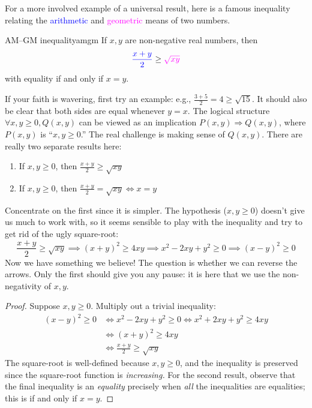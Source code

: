 For a more involved example of a universal result, here is a famous inequality relating the \textcolor{blue}{arithmetic} and \textcolor{Magenta}{geometric} means of two numbers.

\begin{thm}{AM--GM inequality}{amgm}
	If $x,y$ are non-negative real numbers, then
	\[
		\textcolor{blue}{\frac{x+y}{2}}\ge\textcolor{Magenta}{\sqrt{xy}}
	\]
	with equality if and only if $x=y$.
\end{thm}

If your faith is wavering, first try an example: e.g., $\frac{3+5}2=4\ge \sqrt{15}$. It should also be clear that both sides are equal whenever $y=x$. The logical structure $\forall x,y\ge 0, Q(x,y)$ can be viewed as an implication $P(x,y)\Longrightarrow Q(x,y)$, where $P(x,y)$ is ``$x,y\ge 0$.'' The real challenge is making sense of $Q(x,y)$. There are really two separate results here:
\begin{enumerate}
  \item If $x,y\ge 0$, then $\frac{x+y}{2}\ge\sqrt{xy}$
  \item If $x,y\ge 0$, then $\frac{x+y}{2}=\sqrt{xy}\iff x=y$
\end{enumerate}

Concentrate on the first since it is simpler. The hypothesis ($x,y\ge 0$) doesn't give us much to work with, so it seems sensible to play with the inequality and try to get rid of the ugly square-root:
\[
	\frac{x+y}2\ge \sqrt{xy} \implies (x+y)^2\ge 4xy \implies x^2-2xy+y^2\ge 0\implies (x-y)^2\ge 0
\]
Now we have something we believe! The question is whether we can reverse the arrows. Only the first should give you any pause: it is here that we use the non-negativity of $x,y$.

\begin{proof}
	Suppose $x,y\ge 0$. Multiply out a trivial inequality:
	\begin{align*}
		(x-y)^2\ge 0&\iff x^2-2xy+y^2\ge 0 \iff x^2+2xy+y^2\ge 4xy\\
		&\iff (x+y)^2\ge 4xy\\
		&\iff \frac{x+y}{2}\ge \sqrt{xy}
	\end{align*}
	The square-root is well-defined because $x,y\ge 0$, and the inequality is preserved since the square-root function is \emph{increasing.} For the second result, observe that the final inequality is an \emph{equality} precisely when \emph{all} the inequalities are equalities; this is if and only if $x=y$.
\end{proof}

